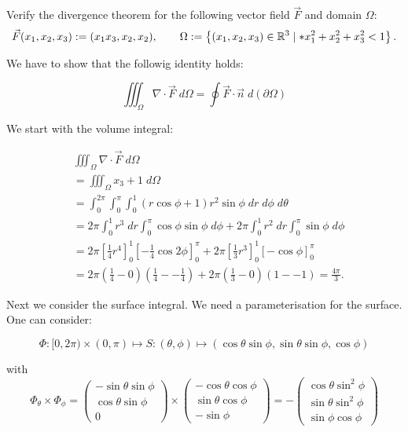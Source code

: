 \documentclass[11pt]{article}
\begin{document}
\begin{exercise}
    Verify the divergence theorem for the following vector field $\vec F$ and domain $\Omega$:
    \begin{gather*}
        \vec F(x_1,x_2,x_3) := ( x_1 x_3, x_2, x_2 ),
        \qquad 
        \Omega := \left\{ (x_1,x_2,x_3) \in \mathbb R^3 \suchthat* x_1^2 + x_2^2 + x_3^2 < 1 \right\}
        .
    \end{gather*}
\end{exercise}
\begin{solution}    
We have to show that the followig identity holds: 

$$
\iiint_{\Omega}\nabla \cdot \vec{F}\;d\Omega =  \oint \vec{F}\cdot \vec{n} \;d(\partial \Omega)
$$ 

We start with the volume integral:

    \begin{align*}
        &
        \iiint_{\Omega}\nabla \cdot \vec{F}\;d\Omega
        \\&
        =
        \iiint_{\Omega}x_3 + 1\;d\Omega
        \\&
        =
        \int_{0}^{2\pi}\int_0^{\pi}\int_0^ 1 (r\cos\phi + 1)r^ 2\sin\phi\;d r\;d\phi\;d\theta
        \\&
        =
        2\pi\int_0^1 r^3\;d r\int_0^{\pi}\cos\phi\sin\phi\;d \phi + 2\pi\int_0^1 r^2\;d r\int_0^{\pi}\sin\phi\;d \phi 
        \\&
        =
        2\pi\left[ \frac{1}{4}r^ 4 \right]_0^ {1} \left[-\frac{1}{4}\cos2\phi\right]_0^{\pi} + 2\pi\left[ \frac{1}{3}r^ 3 \right]_0^ {1} \left[-\cos\phi\right]_0^{\pi}
        \\&
        =
        2\pi\left(\frac{1}{4} - 0\right)\left(\frac{1}{4} - -\frac{1}{4}\right) + 2\pi\left(\frac{1}{3} - 0\right)\left(1 - - 1\right) = \frac{4\pi}{3}
        .
    \end{align*}

Next we consider the surface integral. We need a parameterisation for the surface. One can consider:

$$
\Phi: [0,2\pi) \times (0,\pi) \mapsto S: (\theta,\phi)\mapsto (\cos\theta \sin\phi, \sin\theta\sin\phi,\cos\phi)
$$

with 
$$
\Phi_{\theta}\times \Phi_{\phi}  = \begin{pmatrix} -\sin\theta\sin\phi\\ \cos\theta\sin\phi \\0 \end{pmatrix} \times \begin{pmatrix} -\cos\theta\cos\phi\\ \sin\theta\cos\phi \\-\sin\phi \end{pmatrix} = -\begin{pmatrix} \cos\theta\sin^2\phi\\ \sin\theta\sin^2\phi \\\sin\phi\cos\phi \end{pmatrix} 
$$


\end{solution}
\end{document}
